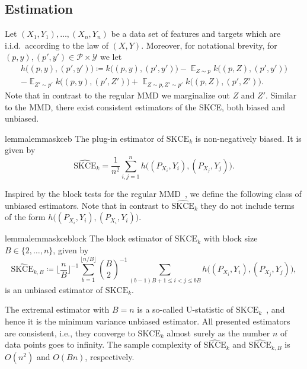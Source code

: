 \documentclass{article}
\DeclareMathOperator{\Exp}{\mathbb{E}}
\begin{document}
\subsection{Estimation}

Let $(X_1, Y_1), \ldots, (X_n, Y_n)$ be a data set of features and targets which are i.i.d.\
according to the law of $(X, Y)$. Moreover, for notational brevity, for
$(p, y), (p', y') \in \mathcal{P} \times \mathcal{Y}$ we let
\begin{multline*}
    h\big((p, y), (p', y')\big) \coloneqq k\big((p, y), (p', y')\big) - \Exp_{Z \sim p} k\big((p, Z), (p', y')\big) \\
    - \Exp_{Z' \sim p'} k\big((p, y), (p', Z')\big) + \Exp_{Z \sim p, Z' \sim p'} k\big((p, Z), (p', Z')\big).
\end{multline*}
Note that in contrast to the regular MMD we marginalize out $Z$ and $Z'$. Similar to the MMD, there exist
consistent estimators of the SKCE, both biased and unbiased.

\begin{restatable}{lemma}{lemmaskceb}\label{lemma:skceb}
The plug-in estimator of $\mathrm{SKCE}_k$ is non-negatively biased. It is given by
\begin{equation*}
    \widehat{\mathrm{SKCE}}_k =
    \frac{1}{n^2} \sum_{i,j=1}^n h\big((P_{X_i}, Y_i), (P_{X_j}, Y_j)\big).
\end{equation*}
\end{restatable}

Inspired by the block tests for the regular MMD~\citep{Zaremba2013}, we define the
following class of unbiased estimators. Note that in contrast to $\widehat{\mathrm{SKCE}}_k$
they do not include terms of the form $h\big((P_{X_i}, Y_i), (P_{X_i}, Y_i)\big)$.

\begin{restatable}{lemma}{lemmaskceblock}\label{lemma:skceblock}
The block estimator of $\mathrm{SKCE}_k$ with
block size $B \in \{2,\ldots,n\}$, given by
\begin{equation*}
    \widehat{\mathrm{SKCE}}_{k,B} \coloneqq \bigg\lfloor \frac{n}{B} \bigg\rfloor^{-1} \sum_{b=1}^{\lfloor n / B \rfloor} \binom{B}{2}^{-1} \sum_{(b - 1) B + 1 \leq i < j \leq bB} h\big((P_{X_{i}}, Y_i), (P_{X_j}, Y_j)\big),
\end{equation*}
is an unbiased estimator of $\mathrm{SKCE}_k$.
\end{restatable}

The extremal estimator with $B = n$ is a so-called U-statistic of
$\mathrm{SKCE}_k$~\citep{Hoeffding1948,Vaart1998}, and hence it is
the minimum variance unbiased estimator. All presented estimators are
consistent, i.e., they converge to $\mathrm{SKCE}_k$ almost surely as
the number $n$ of data points goes to infinity. The sample complexity
of $\widehat{\mathrm{SKCE}}_k$ and $\widehat{\mathrm{SKCE}}_{k,B}$ is
$O(n^2)$ and $O(Bn)$, respectively.
\end{document}
